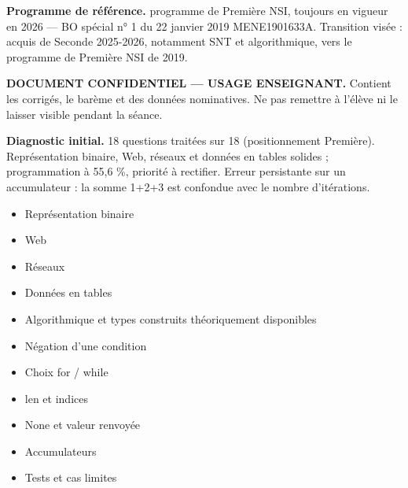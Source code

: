 \documentclass[10pt,a4paper]{article}
\begin{document}
\begin{methodbox}\small\textbf{Programme de référence.} programme de Première NSI, toujours en vigueur en 2026 --- BO spécial n° 1 du 22 janvier 2019 MENE1901633A. Transition visée : acquis de Seconde 2025-2026, notamment SNT et algorithmique, vers le programme de Première NSI de 2019.\end{methodbox}
\begin{keybox}\textbf{DOCUMENT CONFIDENTIEL --- USAGE ENSEIGNANT.} Contient les corrigés, le barème et des données nominatives. Ne pas remettre à l'élève ni le laisser visible pendant la séance.\end{keybox}
\begin{methodbox}
\textbf{Diagnostic initial.} 18 questions traitées sur 18 (positionnement Première). Représentation binaire, Web, réseaux et données en tables solides ; programmation à 55,6 \%, priorité à rectifier. Erreur persistante sur un accumulateur : la somme 1+2+3 est confondue avec le nombre d'itérations.
\end{methodbox}
\begin{itemize}\item Représentation binaire\item Web\item Réseaux\item Données en tables\item Algorithmique et types construits théoriquement disponibles\end{itemize}
\begin{itemize}\item Négation d'une condition\item Choix for / while\item len et indices\item None et valeur renvoyée\item Accumulateurs\item Tests et cas limites\end{itemize}
\end{document}
